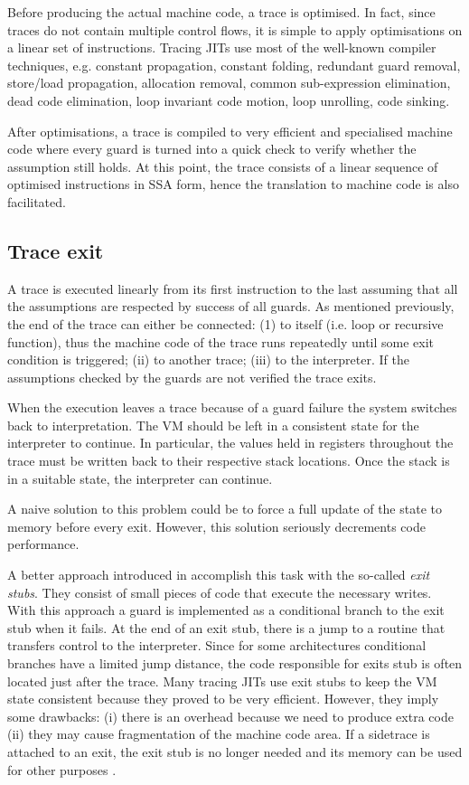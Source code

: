 Before producing the actual machine code, a trace is optimised. In fact, since traces do not contain multiple control flows, it is simple to apply optimisations on a linear set of instructions. Tracing JITs use most of the well-known compiler techniques, e.g. constant propagation, constant folding, redundant guard removal, store/load propagation, allocation removal, common sub-expression elimination, dead code elimination, loop invariant code motion, loop unrolling, code sinking. 

After optimisations, a trace is compiled to very efficient and specialised machine code where every guard is turned into a quick check to verify whether the assumption still holds. At this point, the trace consists of a linear sequence of optimised instructions in SSA form, hence the translation to machine code is also facilitated.

\subsection{Trace exit}
\label{subsec:trace-exit}
A trace is executed linearly from its first instruction to the last assuming that all the assumptions are respected by success of all guards. As mentioned previously, the end of the trace can either be connected: (1) to itself (i.e. loop or recursive function), thus the machine code of the trace runs repeatedly until some exit condition is triggered; (ii) to another trace; (iii) to the interpreter. If the assumptions checked by the guards are not verified the trace exits. 

When the execution leaves a trace because of a guard failure the system switches back to interpretation. The VM should be left in a consistent state for the interpreter to continue. In particular, the values held in registers throughout the trace must be written back to their respective stack locations. Once the stack is in a suitable state, the interpreter can continue.

A naive solution to this problem could be to force a full update of the state to memory before every exit. However, this solution seriously decrements code performance.

A better approach introduced in \cite{bala1999transparent} accomplish this task with the so-called \textit{exit stubs}. They consist of small pieces of code that execute the necessary writes. With this approach a guard is implemented as a conditional branch to the exit stub when it fails. At the end of an exit stub, there is a jump to a routine that transfers control to the interpreter. Since for some architectures conditional branches have a limited jump distance, the code responsible for exits stub is often located just after the trace. Many tracing JITs use exit stubs to keep the VM state consistent because they proved to be very efficient. However, they imply some drawbacks: (i) there is an overhead because we need to produce extra code (ii) they may cause fragmentation of the machine code area. If a sidetrace is attached to an exit, the exit stub is no longer needed and its memory can be used for other purposes \cite{schilling2013trace}.

